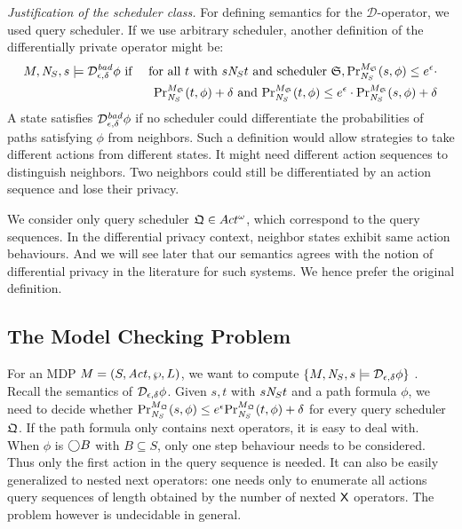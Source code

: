 \noindent
\emph{Justification of the scheduler class.}
For defining semantics for the $\mathcal{D}$-operator, we used query scheduler.
If we use arbitrary scheduler, another definition of the differentially private operator
might be:
\begin{eqnarray*}
  M, \neighbor{S}, s \models \dpriv{\epsilon}{\delta}^{\mathit{bad}} \phi
  & \textmd{ if } &
  \textmd{for all } t \textmd{ with } s \neighbor{S} t \textmd{ and
  scheduler } \scheduler{S},
  \myPr{s}{M_{\scheduler{S}}}{\neighbor{S}}{\phi} \leq
  e^{\epsilon} \cdot\\
  && \myPr{t}{M_{\scheduler{S}}}{\neighbor{S}}{\phi} + \delta \textmd{ and }
  \myPr{t}{M_{\scheduler{S}}}{\neighbor{S}}{\phi} \leq
  e^{\epsilon} \cdot \myPr{s}{M_{\scheduler{S}}}{\neighbor{S}}{\phi}
  + \delta
\end{eqnarray*}
A state satisfies $\dpriv{\epsilon}{\delta}^{\mathit{bad}} \phi$ if
no scheduler could differentiate the probabilities of paths satisfying
$\phi$ from neighbors. Such a definition would allow strategies to
take different actions from different states. It might need different
action sequences to distinguish neighbors. Two neighbors could still be
differentiated by an action sequence and lose their privacy.

We consider only query scheduler $\scheduler{Q}\in Act^\omega$, which correspond to the query sequences. In the differential privacy context, neighbor states exhibit same action behaviours. And we will see later that
our semantics agrees with the notion of differential privacy in the literature for such systems.
We hence
prefer the original definition.

\subsection{The Model Checking Problem}
For an MDP $M =
(S, \Act, \wp, L)$, we want to compute $\{ M, \neighbor{S}, s \models
\dpriv{\epsilon}{\delta} \phi \}$ . Recall the semantics of $\dpriv{\epsilon}{\delta}
\phi$. Given $s, t$ with $s \neighbor{S} t$ and a path formula
$\phi$, we need to decide whether
$\myPr{s}{M_{\scheduler{Q}}}{\neighbor{S}}{\phi} \leq
e^{\epsilon} \myPr{t}{M_{\scheduler{Q}}}{\neighbor{S}}{\phi} + \delta$
for every query scheduler $\scheduler{Q}$.
If the path formula only contains next operators, it is easy to deal with. When $\phi$ is $\gX B$ with $B\subseteq S$, only one step behaviour needs to be considered. Thus only the first action in the query sequence is needed. It can also be easily generalized to nested next operators:  one needs only to enumerate
all actions query sequences of length obtained by the number of nexted $\X$ operators.
The problem however is undecidable in general.

